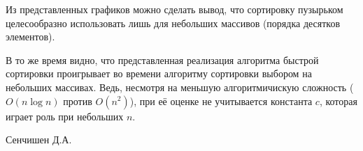 \documentclass[
	12pt,
	paper=A4,
	oneside,
	draft
]{scrreprt}
\begin{document}
Из представленных графиков можно сделать вывод, что сортировку пузырьком целесообразно использовать лишь для небольших массивов (порядка десятков элементов). 

В то же время видно, что представленная реализация алгоритма быстрой сортировки проигрывает во времени алгоритму сортировки выбором на небольших массивах. Ведь, несмотря на меньшую алгоритмичискую сложность ($O(n\log n)$ против $O(n^2)$), при её оценке не учитывается константа $c$, которая играет роль при небольших $n$.

\vfill
\begin{flushright}
Сенчишен Д.А.
\end{flushright}
\end{document}
